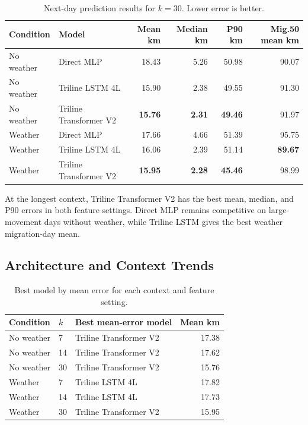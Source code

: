 \documentclass{article}
\begin{document}
\begin{table}[H]
\centering
\caption{Next-day prediction results for $k=30$. Lower error is better.}
\label{tab:k30_results}
\begin{tabular}{llrrrr}
\toprule
Condition & Model & Mean km & Median km & P90 km & Mig.50 mean km \\
\midrule
No weather & Direct MLP & 18.43 & 5.26 & 50.98 & 90.07 \\
No weather & Triline LSTM 4L & 15.90 & 2.38 & 49.55 & 91.30 \\
No weather & Triline Transformer V2 & \textbf{15.76} & \textbf{2.31} & \textbf{49.46} & 91.97 \\
\midrule
Weather & Direct MLP & 17.66 & 4.66 & 51.39 & 95.75 \\
Weather & Triline LSTM 4L & 16.06 & 2.39 & 51.14 & \textbf{89.67} \\
Weather & Triline Transformer V2 & \textbf{15.95} & \textbf{2.28} & \textbf{45.46} & 98.99 \\
\bottomrule
\end{tabular}
\end{table}

At the longest context, Triline Transformer V2 has the best mean, median, and P90 errors in both feature settings. Direct MLP remains competitive on large-movement days without weather, while Triline LSTM gives the best weather migration-day mean.

\subsection{Architecture and Context Trends}

\begin{table}[H]
\centering
\caption{Best model by mean error for each context and feature setting.}
\label{tab:cross_k_winners}
\begin{tabular}{lllr}
\toprule
Condition & $k$ & Best mean-error model & Mean km \\
\midrule
No weather & 7 & Triline Transformer V2 & 17.38 \\
No weather & 14 & Triline Transformer V2 & 17.62 \\
No weather & 30 & Triline Transformer V2 & 15.76 \\
Weather & 7 & Triline LSTM 4L & 17.82 \\
Weather & 14 & Triline LSTM 4L & 17.73 \\
Weather & 30 & Triline Transformer V2 & 15.95 \\
\bottomrule
\end{tabular}
\end{table}
\end{document}

